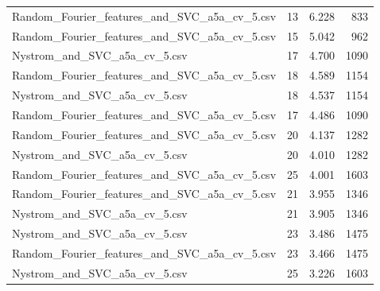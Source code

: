 \begin{tabularx}{\textwidth}{lrrr}
Random\_Fourier\_features\_and\_SVC\_a5a\_cv\_5.csv &       13 &    6.228 &           833 \\
Random\_Fourier\_features\_and\_SVC\_a5a\_cv\_5.csv &       15 &    5.042 &           962 \\
                Nystrom\_and\_SVC\_a5a\_cv\_5.csv &       17 &    4.700 &          1090 \\
Random\_Fourier\_features\_and\_SVC\_a5a\_cv\_5.csv &       18 &    4.589 &          1154 \\
                Nystrom\_and\_SVC\_a5a\_cv\_5.csv &       18 &    4.537 &          1154 \\
Random\_Fourier\_features\_and\_SVC\_a5a\_cv\_5.csv &       17 &    4.486 &          1090 \\
Random\_Fourier\_features\_and\_SVC\_a5a\_cv\_5.csv &       20 &    4.137 &          1282 \\
                Nystrom\_and\_SVC\_a5a\_cv\_5.csv &       20 &    4.010 &          1282 \\
Random\_Fourier\_features\_and\_SVC\_a5a\_cv\_5.csv &       25 &    4.001 &          1603 \\
Random\_Fourier\_features\_and\_SVC\_a5a\_cv\_5.csv &       21 &    3.955 &          1346 \\
                Nystrom\_and\_SVC\_a5a\_cv\_5.csv &       21 &    3.905 &          1346 \\
                Nystrom\_and\_SVC\_a5a\_cv\_5.csv &       23 &    3.486 &          1475 \\
Random\_Fourier\_features\_and\_SVC\_a5a\_cv\_5.csv &       23 &    3.466 &          1475 \\
                Nystrom\_and\_SVC\_a5a\_cv\_5.csv &       25 &    3.226 &          1603 \\
\bottomrule
\end{tabularx}
